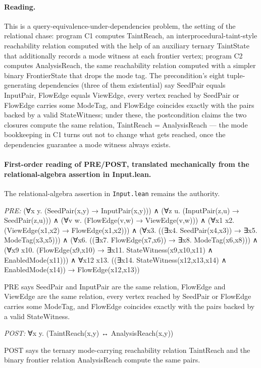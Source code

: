 \documentclass[10pt]{article}
\begin{document}
\paragraph{Reading.} This is a query-equivalence-under-dependencies problem, the setting of the relational chase: program C1 computes TaintReach, an interprocedural-taint-style reachability relation computed with the help of an auxiliary ternary TaintState that additionally records a mode witness at each frontier vertex; program C2 computes AnalysisReach, the same reachability relation computed with a simpler binary FrontierState that drops the mode tag. The precondition's eight tuple-generating dependencies (three of them existential) say SeedPair equals InputPair, FlowEdge equals ViewEdge, every vertex reached by SeedPair or FlowEdge carries some ModeTag, and FlowEdge coincides exactly with the pairs backed by a valid StateWitness; under these, the postcondition claims the two closures compute the same relation, TaintReach = AnalysisReach --- the mode bookkeeping in C1 turns out not to change what gets reached, once the dependencies guarantee a mode witness always exists.

\paragraph{First-order reading of PRE/POST, translated mechanically from the relational-algebra assertion in Input.lean.} The relational-algebra assertion in \texttt{Input.lean} remains the authority.

\textit{PRE:} (∀x y. (SeedPair(x,y) → InputPair(x,y))) ∧ (∀z u. (InputPair(z,u) → SeedPair(z,u))) ∧ (∀v w. (FlowEdge(v,w) → ViewEdge(v,w))) ∧ (∀x1 x2. (ViewEdge(x1,x2) → FlowEdge(x1,x2))) ∧ (∀x3. ((∃x4. SeedPair(x4,x3)) → ∃x5. ModeTag(x3,x5))) ∧ (∀x6. ((∃x7. FlowEdge(x7,x6)) → ∃x8. ModeTag(x6,x8))) ∧ (∀x9 x10. (FlowEdge(x9,x10) → ∃x11. StateWitness(x9,x10,x11) ∧ EnabledMode(x11))) ∧ ∀x12 x13. ((∃x14. StateWitness(x12,x13,x14) ∧ EnabledMode(x14)) → FlowEdge(x12,x13))\par PRE says SeedPair and InputPair are the same relation, FlowEdge and ViewEdge are the same relation, every vertex reached by SeedPair or FlowEdge carries some ModeTag, and FlowEdge coincides exactly with the pairs backed by a valid StateWitness.

\textit{POST:} ∀x y. (TaintReach(x,y) ↔ AnalysisReach(x,y))\par POST says the ternary mode-carrying reachability relation TaintReach and the binary frontier relation AnalysisReach compute the same pairs.
\end{document}
